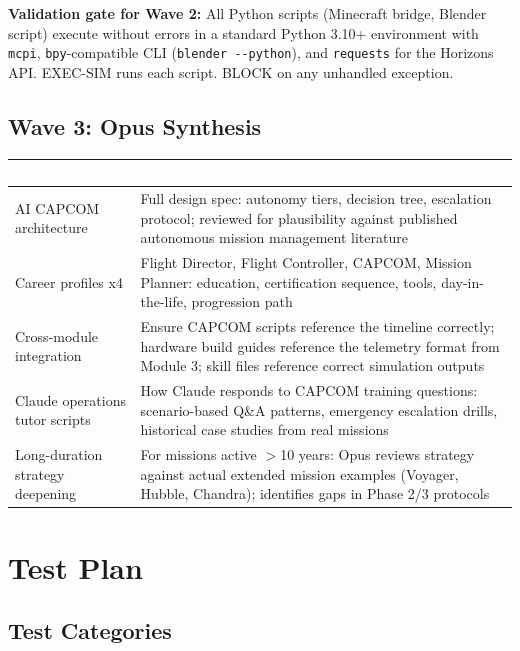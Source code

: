 \documentclass[11pt,letterpaper]{article}
\newcommand{\tableheader}[1]{\textbf{\sffamily\textcolor{white}{#1}}}
\begin{document}
\textbf{Validation gate for Wave 2:} All Python scripts (Minecraft bridge, Blender script) execute without errors in a standard Python 3.10+ environment with \texttt{mcpi}, \texttt{bpy}-compatible CLI (\texttt{blender -{}-python}), and \texttt{requests} for the Horizons API. EXEC-SIM runs each script. BLOCK on any unhandled exception.

\subsection{Wave 3: Opus Synthesis}

\begin{center}
\begin{tabularx}{\textwidth}{L{4cm}X}
\toprule
{}
\tableheader{Synthesis Task} & \tableheader{Description} \\
\midrule
AI CAPCOM architecture & Full design spec: autonomy tiers, decision tree, escalation protocol; reviewed for plausibility against published autonomous mission management literature \\
Career profiles x4 & Flight Director, Flight Controller, CAPCOM, Mission Planner: education, certification sequence, tools, day-in-the-life, progression path \\
Cross-module integration & Ensure CAPCOM scripts reference the timeline correctly; hardware build guides reference the telemetry format from Module 3; skill files reference correct simulation outputs \\
Claude operations tutor scripts & How Claude responds to CAPCOM training questions: scenario-based Q\&A patterns, emergency escalation drills, historical case studies from real missions \\
Long-duration strategy deepening & For missions active $>$10 years: Opus reviews strategy against actual extended mission examples (Voyager, Hubble, Chandra); identifies gaps in Phase 2/3 protocols \\
\bottomrule
\end{tabularx}
\end{center}

\section{Test Plan}

\subsection{Test Categories}
\end{document}
